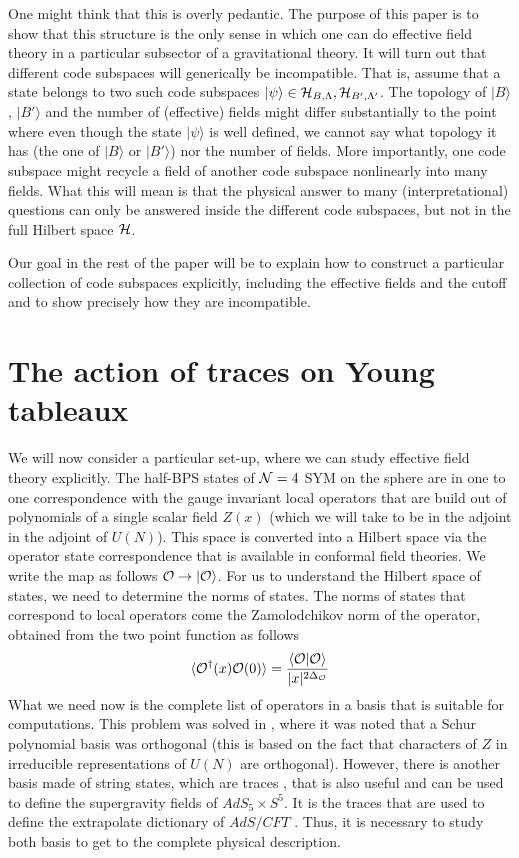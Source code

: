 \documentclass[12pt,nofootinbib, longbibliography]{revtex4-1}
\newcommand\vev[1]{\langle #1\rangle}
\newcommand\ket[1]{| #1\rangle}
\newcommand\braket[2]{\langle #1|#2\rangle}
\newcommand{\CO}{  {\cal O}  }
\begin{document}
One might think that this is overly pedantic. The purpose of this paper is to show that this structure is the only sense in which one can do effective field theory
in a particular subsector of a gravitational theory.  It will turn out that different code subspaces will 
generically be incompatible. That is, assume that a  state belongs to two such code subspaces  $\ket \psi \in  {\cal H}_{B,\Lambda}, {\cal H}_{B',\Lambda'}$. The topology of $\ket B$, $\ket {B'}$ and the number of (effective)  fields might differ substantially to the point where even though the state $\ket \psi$ is well defined, we cannot say what topology it has (the one of $\ket B $ or $\ket {B'}$) nor the number of fields. More importantly, one code subspace might recycle a field of another code subspace nonlinearly into many fields. What this will mean is that the physical answer to many  (interpretational) questions  can only be answered inside the different code subspaces, but not in the full Hilbert space ${\cal H}$. 



Our goal in the rest of the paper will be to explain how to construct a particular collection of code subspaces explicitly, including the effective fields and the cutoff and to show precisely how they are incompatible.




\section{The action of traces on Young tableaux}\label{sec:YT}

We will now consider a particular set-up, where we can study effective field theory explicitly. The half-BPS states of ${\cal N}=4 $ SYM on the sphere are in one to one correspondence with the gauge invariant local operators that are build out of polynomials of a single scalar field $Z(x)$ (which we will take to be in the adjoint in the adjoint of $U(N)$). This space is converted into a Hilbert space via the operator state correspondence that is available in conformal field theories. We write the map as follows $\CO\to \ket \CO$.
For us to understand the Hilbert space of states, we need to determine the norms of states. The norms of states that correspond to local operators come the Zamolodchikov norm of the operator, obtained from the two point function as follows
\begin{equation}
\vev{\CO^\dagger(x) \CO(0)} = \frac{\braket {\CO}{\CO}}{|x|^{2\Delta_\CO}}
\end{equation}
What we need now is the complete list of operators in a basis that is suitable for computations. This problem was solved in \cite{Corley:2001zk}, where it was noted that a Schur polynomial basis was orthogonal
(this is based on the fact that characters of $Z$ in irreducible representations of $U(N)$ are orthogonal). However, there is another basis made of string states, which are traces , that is also useful and can be used to define the supergravity fields of $AdS_5\times S^5$. It is the traces that are used to define the extrapolate dictionary of $AdS/CFT$ \cite{Witten:1998qj}. Thus, it is necessary to study both basis to get to the complete physical description.
\end{document}

